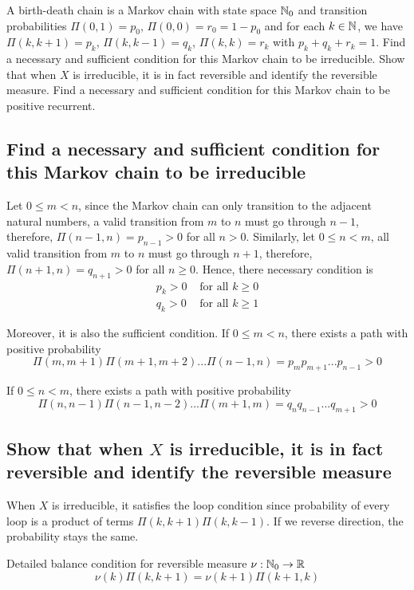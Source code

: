 \documentclass{article}
\begin{document}
A birth-death chain is a Markov chain with state space $\mathbb{N}_0$ and transition probabilities $\Pi(0, 1) = p_0$, $\Pi(0, 0) = r_0 = 1 - p_0$ and for each $k \in \mathbb{N}$, we have $\Pi(k, k+1) = p_k$, $\Pi(k, k-1) = q_k$, $\Pi(k, k) = r_k$ with $p_k + q_k + r_k = 1$. Find a necessary and sufficient condition for this Markov chain to be irreducible. Show that when $X$ is irreducible, it is in fact reversible and identify the reversible measure. Find a necessary and sufficient condition for this Markov chain to be positive recurrent.

\subsection{Find a necessary and sufficient condition for this Markov chain to be irreducible}

Let $0 \leq m < n$, since the Markov chain can only transition to the adjacent natural numbers, a valid transition from $m$ to $n$ must go through $n - 1$, therefore, $\Pi(n-1, n) = p_{n-1} > 0$ for all $n > 0$. Similarly, let $0 \leq n < m$, all valid transition from $m$ to $n$ must go through $n+1$, therefore, $\Pi(n+1, n) = q_{n+1} > 0$ for all $n \geq 0$. Hence, there necessary condition is
\begin{align*}
    p_k > 0 &\text{ for all $k \geq 0$} \\
    q_k > 0 &\text{ for all $k \geq 1$}  
\end{align*}

Moreover, it is also the sufficient condition. If $0 \leq m < n$, there exists a path with positive probability
$$
    \Pi(m, m+1) \Pi(m+1, m+2) ... \Pi(n-1, n) = p_m p_{m+1} ... p_{n-1} > 0
$$

If $0 \leq n < m$, there exists a path with positive probability
$$
    \Pi(n, n-1) \Pi(n-1, n-2) ... \Pi(m+1, m) = q_n q_{n-1} ... q_{m+1} > 0
$$

\subsection{Show that when $X$ is irreducible, it is in fact reversible and identify the reversible measure}

When $X$ is irreducible, it satisfies the loop condition since probability of every loop is a product of terms $\Pi(k, k+1) \Pi(k, k-1)$. If we reverse direction, the probability stays the same.

Detailed balance condition for reversible measure $\nu: \mathbb{N}_0 \to \mathbb{R}$
$$
    \nu(k) \Pi(k, k+1) = \nu(k+1) \Pi(k+1, k)
$$
\end{document}
